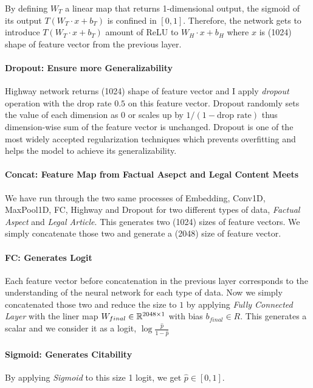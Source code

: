 \documentclass[12pt,letterpaper]{article}
\begin{document}
\noindent By defining $W_T$ a linear map that returns 1-dimensional output, the sigmoid of its output $T(W_T \cdot x + b_T)$ is confined in $[0, 1]$. Therefore, the network gets to introduce $T(W_T \cdot x + b_T)$ amount of ReLU to $W_H \cdot x + b_H$ where $x$ is (1024) shape of feature vector from the previous layer.

\paragraph{Dropout: Ensure more Generalizability}

Highway network returns (1024) shape of feature vector and I apply \textit{dropout} operation \citep{dropout} with the drop rate $0.5$ on this feature vector. Dropout randomly sets the value of each dimension as $0$ or scales up by $1/(1-\text{drop rate})$ thus dimension-wise sum of the feature vector is unchanged.
Dropout is one of the most widely accepted regularization techniques which prevents overfitting and helps the model to achieve its generalizability.


\paragraph{Concat: Feature Map from Factual Asepct and Legal Content Meets}

We have run through the two same processes of Embedding, Conv1D, MaxPool1D, FC, Highway and Dropout for two different types of data, \textit{Factual Aspect} and \textit{Legal Article}.
This generates two (1024) sizes of feature vectors.
We simply concatenate those two and generate a (2048) size of feature vector.


\paragraph{FC: Generates Logit}
Each feature vector before concatenation in the previous layer corresponds to the understanding of the neural network for each type of data. Now we simply concatenated those two and
reduce the size to $1$ by applying \textit{Fully Connected Layer} with the liner map $W_{final} \in \Bbb R^{2048 \times 1}$ with bias $b_{final} \in R$.
This generates a scalar and we consider it as a logit, $\log{\frac{\hat{p}}{1-\hat{p}}}$

\paragraph{Sigmoid: Generates Citability}
By applying \textit{Sigmoid} to this size 1 logit, we get $\hat{p} \in  [0, 1]$.
\end{document}
